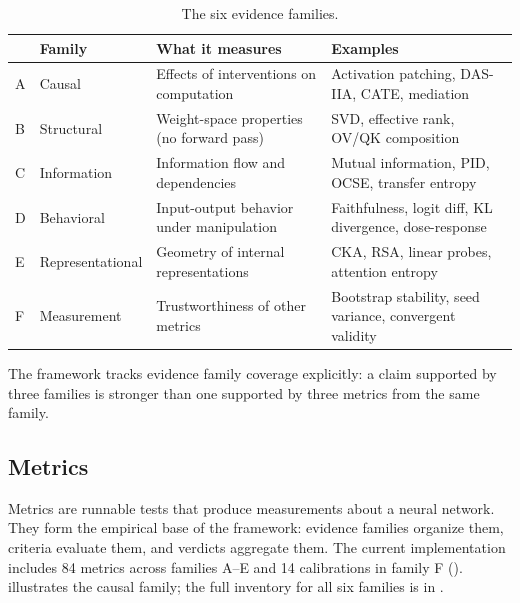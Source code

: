 \documentclass[10pt]{article}
\begin{document}
\begin{table}[H]
\centering
\small
\caption{The six evidence families.}
\label{tab:families}
\renewcommand{\arraystretch}{1.2}
\begin{tabular}{@{}ll>{\raggedright\arraybackslash}p{4.5cm}>{\raggedright\arraybackslash}p{5cm}@{}}
\toprule
& \textbf{Family} & \textbf{What it measures} & \textbf{Examples} \\
\midrule
A & Causal & Effects of interventions on computation & Activation patching, DAS-IIA, CATE, mediation \\
\midrule
B & Structural & Weight-space properties (no forward pass) & SVD, effective rank, OV/QK composition \\
\midrule
C & Information & Information flow and dependencies & Mutual information, PID, OCSE, transfer entropy \\
\midrule
D & Behavioral & Input-output behavior under manipulation & Faithfulness, logit diff, KL divergence, dose-response \\
\midrule
E & Representational & Geometry of internal representations & CKA, RSA, linear probes, attention entropy \\
\midrule
F & Measurement & Trustworthiness of other metrics & Bootstrap stability, seed variance, convergent validity \\
\bottomrule
\end{tabular}
\end{table}

The framework tracks evidence family coverage explicitly: a claim supported by three families is stronger than one supported by three metrics from the same family.

\subsection{Metrics}
\label{sec:metrics}

Metrics are runnable tests that produce measurements about a neural network. They form the empirical base of the framework: evidence families organize them, criteria evaluate them, and verdicts aggregate them. The current implementation includes 84 metrics across families A--E and 14 calibrations in family F ().  illustrates the causal family; the full inventory for all six families is in .
\end{document}
